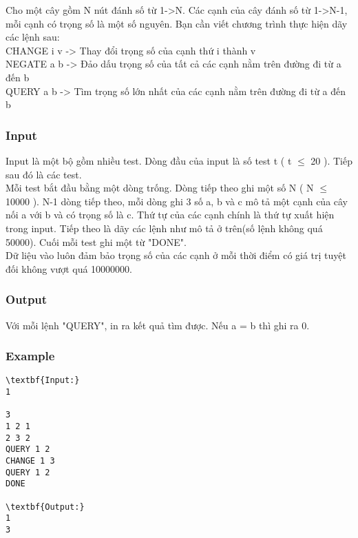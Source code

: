 



   Cho một cây gồm N nút đánh số từ 1->N. Các cạnh của cây đánh số từ 1->N-1, mỗi cạnh có trọng số là một số nguyên. Bạn cần viết chương trình thực hiện dãy các lệnh sau:   
\\   CHANGE i v -> Thay đổi trọng số của cạnh thứ i thành v   
\\   NEGATE a b -> Đảo dấu trọng số của tất cả các cạnh nằm trên đường đi từ a đến b   
\\   QUERY a b -> Tìm trọng số lớn nhất của các cạnh nằm trên đường đi từ a đến b  

\subsubsection{   Input  }

   Input là một bộ gồm nhiều test. Dòng đầu của input là số test t ( t $\le$ 20 ). Tiếp sau đó là các test.   
\\   Mỗi test bắt đầu bằng một dòng trống. Dòng tiếp theo ghi một số N ( N $\le$ 10000 ). N-1 dòng tiếp theo, mỗi dòng ghi 3 số a, b và c mô tả một cạnh của cây nối a với b và có trọng số là c. Thứ tự của các cạnh chính là thứ tự xuất hiện trong input. Tiếp theo là dãy các lệnh như mô tả ở trên(số lệnh không quá 50000). Cuối mỗi test ghi một từ "DONE".   
\\   Dữ liệu vào luôn đảm bảo trọng số của các cạnh ở mỗi thời điểm có giá trị tuyệt đối không vượt quá 10000000.  

\subsubsection{   Output  }

   Với mỗi lệnh "QUERY", in ra kết quả tìm được. Nếu a = b  thì ghi ra 0.  

\subsubsection{   Example  }
\begin{verbatim}
\textbf{Input:}
1

3
1 2 1
2 3 2
QUERY 1 2
CHANGE 1 3
QUERY 1 2
DONE

\textbf{Output:}
1
3
\end{verbatim}
